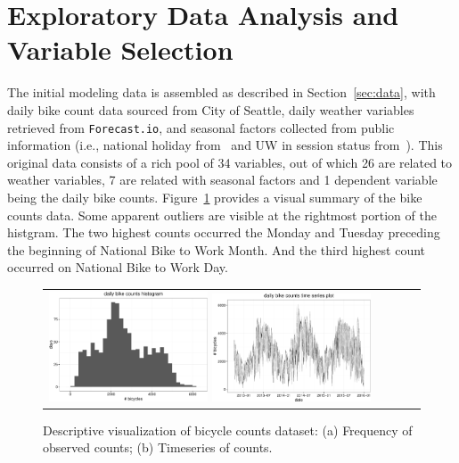 \documentclass [11pt, proquest] {uwthesis}[2015/03/03]
\begin{document}
\section{Exploratory Data Analysis and Variable Selection}
\label{sec:eda}

The initial modeling data is assembled as described in Section~\ref{sec:data}, with daily bike count data sourced from City of Seattle, daily weather variables retrieved from \texttt{Forecast.io}, and seasonal factors collected from public information (i.e., national holiday from~\cite{holiday} and UW in session status from~\cite{uwcalendar}). This original data consists of a rich pool of 34 variables, out of which 26 are related to weather variables, 7 are related with seasonal factors and 1 dependent variable being the daily bike counts. Figure~\ref{fig:descriptionbc} provides a visual summary of the bike counts data. Some apparent outliers are visible at the rightmost portion of the histgram. The two highest counts occurred the Monday and Tuesday preceding the beginning of National Bike to Work Month. And the third highest count occurred on National Bike to Work Day.

\begin{figure}
\begin{tabular}{ll}
\includegraphics[width=0.45\textwidth]{figures/daily_hist}
\includegraphics[width=0.45\textwidth]{figures/daily_tscount_plot}\\
\end{tabular}
\caption{Descriptive visualization of bicycle counts dataset: (a) Frequency of observed counts; (b) Timeseries of counts.}
\label{fig:descriptionbc}
\end{figure}
\end{document}
